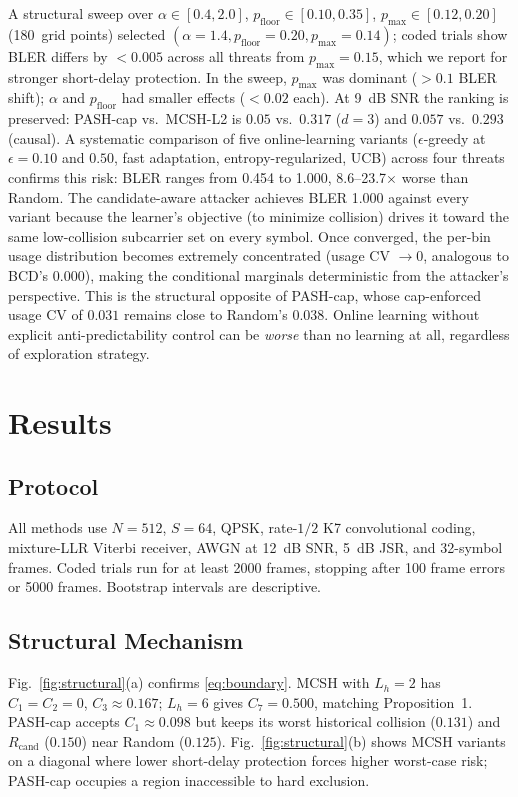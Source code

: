 \documentclass[letterpaper,journal,10pt]{IEEEtran}
\begin{document}
A structural sweep over
$\alpha\in[0.4,2.0]$, $p_{\mathrm{floor}}\in[0.10,0.35]$,
$p_{\max}\in[0.12,0.20]$ (180~grid points) selected
$(\alpha{=}1.4,p_{\mathrm{floor}}{=}0.20,p_{\max}{=}0.14)$; coded trials
show BLER differs by $<0.005$ across all threats from $p_{\max}{=}0.15$,
which we report for stronger short-delay protection. In the sweep, $p_{\max}$ was dominant ($>0.1$ BLER shift);
$\alpha$ and $p_{\mathrm{floor}}$ had smaller effects ($<0.02$ each).
At 9~dB SNR the ranking is preserved: PASH-cap vs.\ MCSH-L2 is
$0.05$ vs.\ $0.317$ ($d{=}3$) and $0.057$ vs.\ $0.293$ (causal).
A systematic comparison of five online-learning variants
($\epsilon$-greedy at $\epsilon{=}0.10$ and $0.50$, fast adaptation, entropy-regularized, UCB) across four threats confirms this risk: BLER ranges from 0.454 to
1.000, 8.6--23.7$\times$ worse than Random. The candidate-aware
attacker achieves BLER 1.000 against every variant because the learner's
objective (to minimize collision) drives it toward the same low-collision
subcarrier set on every symbol. Once converged, the per-bin usage
distribution becomes extremely concentrated (usage CV $\to 0$, analogous to
BCD's $0.000$), making the conditional marginals deterministic from the
attacker's perspective. This is the structural opposite of PASH-cap, whose
cap-enforced usage CV of $0.031$ remains close to Random's $0.038$.
Online learning without explicit anti-predictability control can be
\emph{worse} than no learning at all, regardless of exploration strategy.

\section{Results}
\label{sec:results}
\subsection{Protocol}
All methods use $N=512$, $S=64$, QPSK, rate-$1/2$ K7 convolutional coding,
mixture-LLR Viterbi receiver, AWGN at 12~dB SNR, 5~dB JSR, and 32-symbol
frames. Coded trials run for at least 2000 frames, stopping after 100 frame
errors or 5000 frames. Bootstrap intervals are descriptive.

\subsection{Structural Mechanism}
Fig.~\ref{fig:structural}(a) confirms \eqref{eq:boundary}. MCSH with
$L_h{=}2$ has $C_1{=}C_2{=}0$, $C_3{\approx}0.167$; $L_h{=}6$ gives
$C_7{=}0.500$, matching Proposition~1. PASH-cap accepts
$C_1{\approx}0.098$ but keeps its worst historical collision ($0.131$) and
$R_{\mathrm{cand}}$ ($0.150$) near Random ($0.125$).
Fig.~\ref{fig:structural}(b) shows MCSH variants on a diagonal where lower
short-delay protection forces higher worst-case risk; PASH-cap occupies a
region inaccessible to hard exclusion.
\end{document}
